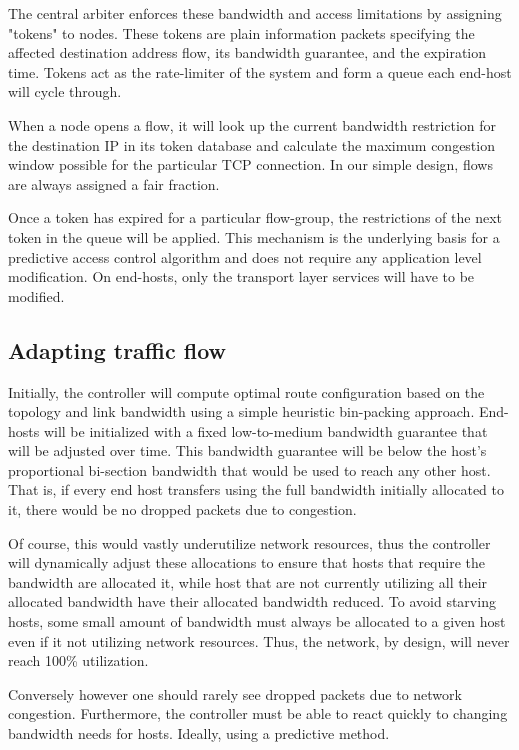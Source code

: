 \documentclass[sigconf]{acmart}
\begin{document}
The central arbiter enforces these bandwidth and access limitations by assigning "tokens" to nodes. These tokens are plain information packets specifying the affected destination address flow, its bandwidth guarantee, and the expiration time. Tokens act as the rate-limiter of the system and form a queue each end-host will cycle through.

When a node opens a flow, it will look up the current bandwidth restriction for the destination IP in its token database and calculate the maximum congestion window possible for the particular TCP connection. In our simple design, flows are always assigned a fair fraction.

Once a token has expired for a particular flow-group, the restrictions of the next token in the queue will be applied. This mechanism is the underlying basis for a predictive access control algorithm and does not require any application level modification. On end-hosts, only the transport layer services will have to be modified.

\subsection{Adapting traffic flow}

Initially, the controller will compute optimal route configuration based on the topology and link bandwidth using a simple heuristic bin-packing approach. End-hosts will be initialized with a fixed low-to-medium bandwidth guarantee that will be adjusted over time. This bandwidth guarantee will be below the host's proportional bi-section bandwidth that would be used to reach any other host. That is, if every end host transfers using the full bandwidth initially allocated to it,  there would be no dropped packets due to congestion.

Of course, this would vastly underutilize network resources, thus the controller will dynamically adjust these allocations to ensure that hosts that require the bandwidth are allocated it, while host that are not currently utilizing all their allocated bandwidth have their allocated bandwidth reduced. To avoid starving hosts, some small amount of bandwidth must always be allocated to a given host even if it not utilizing network resources. Thus, the network, by design, will never reach 100\% utilization.

Conversely however one should rarely see dropped packets due to network congestion. Furthermore, the controller must be able to react quickly to changing bandwidth needs for hosts. Ideally, using a predictive method.
\end{document}
